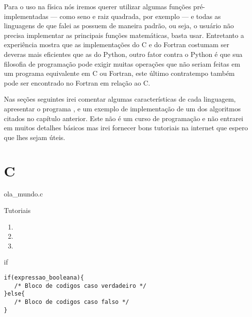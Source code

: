 Para o uso na física nós iremos querer utilizar algumas funções pré-implementadas
--- como seno e raiz quadrada, por exemplo --- e todas as linguagens de que falei
as possuem de maneira padrão, ou seja, o usuário não precisa implementar as principais funções
matemáticas, basta usar. Entretanto a experiência mostra que as implementações
do C e do Fortran costumam ser deveras mais eficientes que as do Python,
outro fator contra o Python é que sua filosofia de programação pode exigir
muitas operações que não seriam feitas em um programa equivalente em C ou Fortran,
este último contratempo também pode ser encontrado no Fortran em relação ao C.

Nas seções seguintes irei comentar algumas características de cada linguagem,
apresentar o programa , e um exemplo de implementação de um dos
algoritmos citados no capítulo anterior. Este não é um curso de programação
e não entrarei em muitos detalhes básicos mas irei fornecer bons tutoriais na internet
que espero que lhes sejam úteis.





\section{C}

{\centering\ttfamily ola\_mundo.c}


{\centering Tutoriais}
\begin{enumerate}[nosep]
\item {}
\item {}
\item {}
\end{enumerate}

\begin{center} if \end{center}
\begin{minipage}[b]{0.45\linewidth}\centering
\end{minipage}
\begin{minipage}[b]{0.45\linewidth}\centering
\begin{lstlisting}[style=c]
if(expressao_booleana){
   /* Bloco de codigos caso verdadeiro */
}else{
   /* Bloco de codigos caso falso */
}
\end{lstlisting}
\end{minipage}

